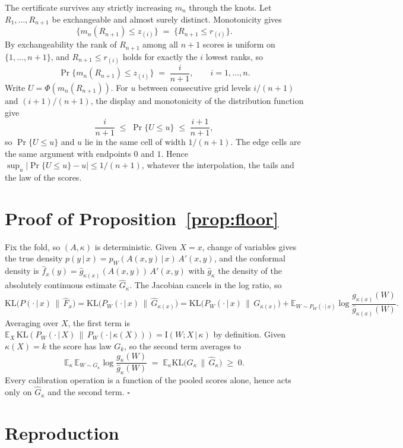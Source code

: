 \documentclass[11pt]{article}
\theoremstyle{remark}
\newcommand{\E}{\mathbb{E}}
\newcommand{\I}{\mathrm{I}}
\newcommand{\given}{\,|\,}
\newcommand{\KLop}{\mathrm{KL}}
\begin{document}
The certificate survives any strictly increasing $m_n$ through the knots. Let
$R_1,\dots,R_{n+1}$ be exchangeable and almost surely distinct. Monotonicity gives
\[
\{m_n(R_{n+1})\le z_{(i)}\}\;=\;\{R_{n+1}\le r_{(i)}\}.
\]
By exchangeability the rank of $R_{n+1}$ among all $n+1$ scores is uniform on
$\{1,\dots,n+1\}$, and $R_{n+1}\le r_{(i)}$ holds for exactly the $i$ lowest ranks,
so
\[
\Pr\{m_n(R_{n+1})\le z_{(i)}\}\;=\;\frac{i}{n+1},\qquad i=1,\dots,n .
\]
Write $U=\Phi(m_n(R_{n+1}))$. For $u$ between consecutive grid levels $i/(n+1)$ and
$(i+1)/(n+1)$, the display and monotonicity of the distribution function give
\[
\frac{i}{n+1}\;\le\;\Pr\{U\le u\}\;\le\;\frac{i+1}{n+1},
\]
so $\Pr\{U\le u\}$ and $u$ lie in the same cell of width $1/(n+1)$. The edge cells
are the same argument with endpoints $0$ and $1$. Hence
$\sup_u|\Pr\{U\le u\}-u|\le 1/(n+1)$, whatever the interpolation, the tails and the
law of the scores.

\section{Proof of Proposition~\ref{prop:floor}}\label{app:floor}

Fix the fold, so $(A,\kappa)$ is deterministic. Given $X=x$, change of
variables gives the true density $p(y\given x) = p_W(A(x,y)\given x)\,A'(x,y)$,
and the conformal density is $\widehat f_x(y) = \widehat
g_{\kappa(x)}(A(x,y))\,A'(x,y)$ with $\widehat g_\kappa$ the density of the
absolutely continuous estimate $\widehat G_\kappa$. The Jacobian cancels in the
log ratio, so
\[
\KLop\big(P(\cdot\given x)\,\|\,\widehat F_x\big)
= \KLop\big(P_W(\cdot\given x)\,\|\,\widehat G_{\kappa(x)}\big)
= \KLop\big(P_W(\cdot\given x)\,\|\,G_{\kappa(x)}\big)
+ \E_{W\sim P_W(\cdot\given x)}\log\frac{g_{\kappa(x)}(W)}{\widehat g_{\kappa(x)}(W)} .
\]
Averaging over $X$, the first term is
$\E_X\,\KLop(P_W(\cdot\given X)\,\|\,P_W(\cdot\given\kappa(X))) =
\I(W;X\given\kappa)$ by definition. Given $\kappa(X)=k$ the score has law $G_k$,
so the second term averages to
\[
\E_\kappa\,\E_{W\sim G_\kappa}\log\frac{g_\kappa(W)}{\widehat g_\kappa(W)}
\;=\;\E_\kappa \KLop\!\big(G_\kappa\,\|\,\widehat G_\kappa\big)\;\ge\;0 .
\]
Every calibration
operation is a function of the pooled scores alone, hence acts only on
$\widehat G_\kappa$ and the second term. \hfill$\square$

\section{Reproduction}\label{sec:repro}
\end{document}

